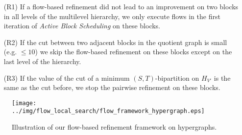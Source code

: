 \begin{enumerate}
\item[(R1)] If a flow-based refinement did not lead to an improvement on two blocks in all levels
            of the multilevel hierarchy, we only execute flows in the first iteration of 
            \emph{Active Block Scheduling} on these blocks.
\item[(R2)] If the cut between two adjacent blocks in the quotient graph is small (e.g. $\le 10$) we
            skip the flow-based refinement on these blocks except on the last level of the hierarchy.
\item[(R3)] If the value of the cut of a minimum $(S,T)$-bipartition on $H_{V'}$ is the same 
            as the cut before, we stop the pairwise refinement on these blocks.
\end{enumerate}

\begin{figure}
\centering 
\texttt{[image: ../img/flow\_local\_search/flow\_framework\_hypergraph.eps]}
\caption{Illustration of our flow-based refinement framework on hypergraphs.}
\label{img:flow_framework}
\end{figure} 